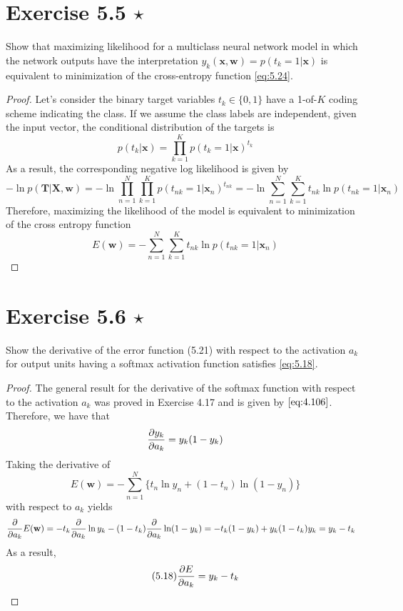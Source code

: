 \section*{Exercise 5.5 $\star$}
Show that maximizing likelihood for a multiclass neural network
model in which the network outputs have the interpretation
$y_k(\mathbf{x}, \mathbf{w}) = p(t_k = 1 | \mathbf{x})$ is equivalent to minimization
of the cross-entropy function \eqref{eq:5.24}.

\vspace{1em}

\begin{proof}
    Let's consider the binary target variables $t_k \in \{0, 1\}$ have a 1-of-$K$ 
    coding scheme indicating the class. If we assume the class labels are independent, 
    given the input vector, the conditional distribution of the targets is
    \[
        p(t_k | \mathbf{x}) = \prod_{k=1}^K p(t_k = 1 | \mathbf{x})^{t_k}
    \] 
    As a result, the corresponding negative log likelihood is given by
    \[
        -\ln p(\mathbf{T} | \mathbf{X}, \mathbf{w})
        = -\ln \prod_{n=1}^N \prod_{k=1}^K p(t_{nk} = 1 | \mathbf{x}_n)^{t_{nk}}
        = -\ln \sum_{n=1}^{N} \sum_{k=1}^{K} t_{nk} \ln p(t_{nk} = 1 | \mathbf{x}_n) 
    \]
    Therefore, maximizing the likelihood of the model is equivalent to minimization
    of the cross entropy function
    \begin{equation}\label{eq:5.24}\tag{5.24}
        E(\mathbf{w}) 
        = -\sum_{n=1}^{N} \sum_{k=1}^{K} t_{nk} \ln p(t_{nk} = 1 | \mathbf{x}_n) 
    \end{equation}
\end{proof}

\section*{Exercise 5.6 $\star$}
Show the derivative of the error function (5.21) with respect
to the activation $a_k$ for output units having a softmax activation
function satisfies \eqref{eq:5.18}.

\vspace{1em}

\begin{proof}
    The general result for the derivative of the softmax function with respect to the 
    activation $a_k$ was proved in Exercise 4.17 and is given by $\eqref{eq:4.106}$.
    Therefore, we have that
    \[
        \pdv{y_k}{a_k} = y_k(1 - y_k)
    \] 
    Taking the derivative of 
    \begin{equation}\label{eq:5.21}\tag{5.21}
        E(\mathbf{w}) = -\sum_{n=1}^{N} \{t_n \ln y_n + (1 - t_n) \ln(1 - y_n)\}
    \end{equation}
    with respect to $a_k$ yields
    \begin{align*}
        \pdv{a_k} E(\mathbf{w}) &= -t_k \pdv{a_k} \ln y_k - (1 - t_k) \pdv{a_k} \ln(1 - y_k) 
        = -t_k(1 - y_k) + y_k(1 - t_k)y_k 
        = y_k - t_k
    \end{align*}
    As a result,
    \begin{equation}\label{eq:5.18}\tag{5.18}
        \pdv{E}{a_k} = y_k - t_k
    \end{equation}
\end{proof}

